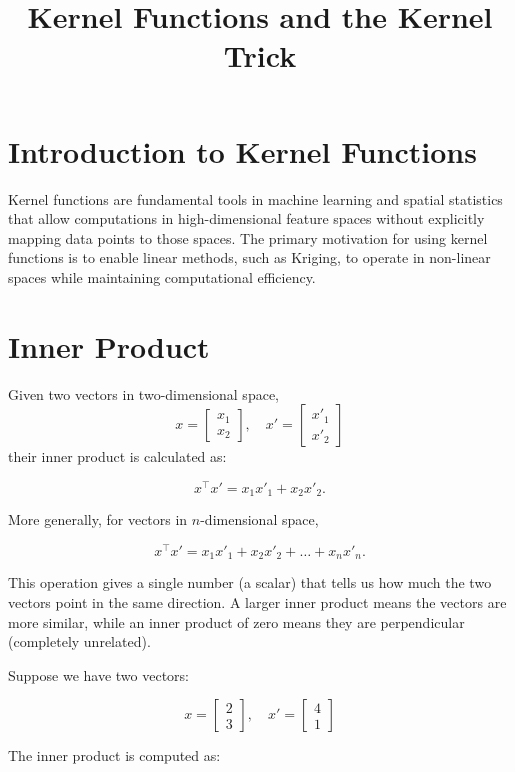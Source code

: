 \documentclass{article}
\title{Kernel Functions and the Kernel Trick}
\author{}
\date{}
\begin{document}
\maketitle

\section{Introduction to Kernel Functions}
Kernel functions are fundamental tools in machine learning and spatial statistics that allow computations in high-dimensional feature spaces without explicitly mapping data points to those spaces. The primary motivation for using kernel functions is to enable linear methods, such as Kriging, to operate in non-linear spaces while maintaining computational efficiency.

\section{Inner Product}

Given two vectors in two-dimensional space, 
\[
x = \begin{bmatrix} x_1 \\ x_2 \end{bmatrix}, \quad x' = \begin{bmatrix} x'_1 \\ x'_2 \end{bmatrix}
\]
their inner product is calculated as:

\[
x^\top x' = x_1 x'_1 + x_2 x'_2.
\]

More generally, for vectors in \( n \)-dimensional space,

\[
x^\top x' = x_1 x'_1 + x_2 x'_2 + \dots + x_n x'_n.
\]

This operation gives a single number (a scalar) that tells us how much the two vectors point in the same direction. A larger inner product means the vectors are more similar, while an inner product of zero means they are perpendicular (completely unrelated).


Suppose we have two vectors:

\[
x = \begin{bmatrix} 2 \\ 3 \end{bmatrix}, \quad x' = \begin{bmatrix} 4 \\ 1 \end{bmatrix}
\]

The inner product is computed as:
\end{document}
